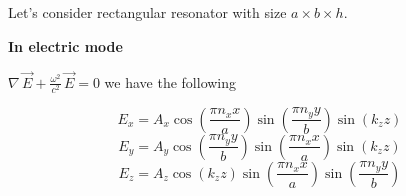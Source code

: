 \documentclass[twoside, 10pt]{article}
\begin{document}
\begin{multicols}{2}






    \section*{}\label{appendix-b.-electromagnetic-pressure-calculation}
\vspace{-3.5mm}


    Let's consider rectangular resonator with size \(a \times b \times h\).

    \textbf{In electric mode}

\(\nabla\,\vec{E} + \frac{\omega^2}{c^2}\,\vec{E} = 0\) we have the
following

\[E_{x} = A_{x} \cos\left(\frac{\pi n_{x} x}{a}\right) \sin\left(\frac{\pi n_{y} y}{b}\right) \sin\left(k_{z} z\right)\]
\[E_{y} = A_{y} \cos\left(\frac{\pi n_{y} y}{b}\right) \sin\left(\frac{\pi n_{x} x}{a}\right) \sin\left(k_{z} z\right)\]
\[E_{z} = A_{z} \cos\left(k_{z} z\right) \sin\left(\frac{\pi n_{x} x}{a}\right) \sin\left(\frac{\pi n_{y} y}{b}\right)\]


\end{multicols}
\end{document}
